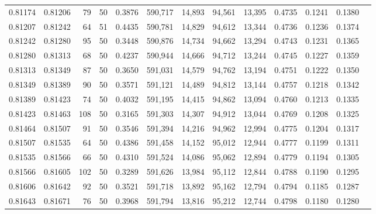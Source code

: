 \begin{tabular}{rrrrrrrrrrrrr}
0.81174 & 0.81206 &    79 &  50 &                                     0.3876 & 590,717 &  14,893 &  94,561 &  13,395 & 0.4735 & 0.1241 & 0.1380 \\
0.81207 & 0.81242 &    64 &  51 &                                     0.4435 & 590,781 &  14,829 &  94,612 &  13,344 & 0.4736 & 0.1236 & 0.1374 \\
0.81242 & 0.81280 &    95 &  50 &                                     0.3448 & 590,876 &  14,734 &  94,662 &  13,294 & 0.4743 & 0.1231 & 0.1365 \\
0.81280 & 0.81313 &    68 &  50 &                                     0.4237 & 590,944 &  14,666 &  94,712 &  13,244 & 0.4745 & 0.1227 & 0.1359 \\
0.81313 & 0.81349 &    87 &  50 &                                     0.3650 & 591,031 &  14,579 &  94,762 &  13,194 & 0.4751 & 0.1222 & 0.1350 \\
0.81349 & 0.81389 &    90 &  50 &                                     0.3571 & 591,121 &  14,489 &  94,812 &  13,144 & 0.4757 & 0.1218 & 0.1342 \\
0.81389 & 0.81423 &    74 &  50 &                                     0.4032 & 591,195 &  14,415 &  94,862 &  13,094 & 0.4760 & 0.1213 & 0.1335 \\
0.81423 & 0.81463 &   108 &  50 &                                     0.3165 & 591,303 &  14,307 &  94,912 &  13,044 & 0.4769 & 0.1208 & 0.1325 \\
0.81464 & 0.81507 &    91 &  50 &                                     0.3546 & 591,394 &  14,216 &  94,962 &  12,994 & 0.4775 & 0.1204 & 0.1317 \\
0.81507 & 0.81535 &    64 &  50 &                                     0.4386 & 591,458 &  14,152 &  95,012 &  12,944 & 0.4777 & 0.1199 & 0.1311 \\
0.81535 & 0.81566 &    66 &  50 &                                     0.4310 & 591,524 &  14,086 &  95,062 &  12,894 & 0.4779 & 0.1194 & 0.1305 \\
0.81566 & 0.81605 &   102 &  50 &                                     0.3289 & 591,626 &  13,984 &  95,112 &  12,844 & 0.4788 & 0.1190 & 0.1295 \\
0.81606 & 0.81642 &    92 &  50 &                                     0.3521 & 591,718 &  13,892 &  95,162 &  12,794 & 0.4794 & 0.1185 & 0.1287 \\
0.81643 & 0.81671 &    76 &  50 &                                     0.3968 & 591,794 &  13,816 &  95,212 &  12,744 & 0.4798 & 0.1180 & 0.1280 \\

\end{tabular}
